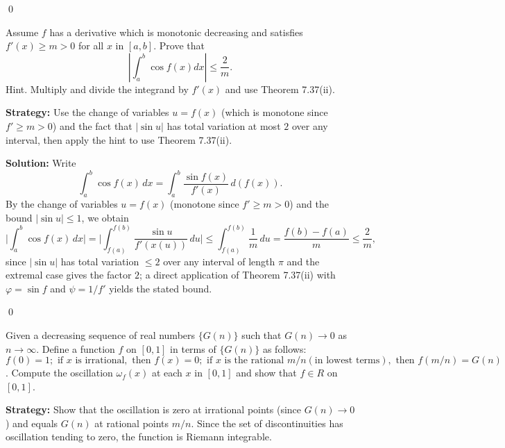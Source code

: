 \qed
\begin{problembox}
\begin{problemstatement}
Assume $f$ has a derivative which is monotonic decreasing and satisfies $f'(x) \geq m > 0$ for all $x$ in $[a, b]$. Prove that
\[\left| \int_{a}^{b} \cos f(x) dx \right| \leq \frac{2}{m}.\]
Hint. Multiply and divide the integrand by $f'(x)$ and use Theorem 7.37(ii).
\end{problemstatement}
\end{problembox}

\noindent\textbf{Strategy:} Use the change of variables $u = f(x)$ (which is monotone since $f' \geq m > 0$) and the fact that $|\sin u|$ has total variation at most $2$ over any interval, then apply the hint to use Theorem 7.37(ii).

\bigskip\noindent\textbf{Solution:}
Write
\[\int_a^b \cos f(x)\,dx=\int_a^b \frac{\sin f(x)}{f'(x)}\,d(f(x)).
\]
By the change of variables $u=f(x)$ (monotone since $f'\ge m>0$) and the bound $|\sin u|\le 1$, we obtain
\[\Big|\int_a^b \cos f(x)\,dx\Big|=\Big|\int_{f(a)}^{f(b)} \frac{\sin u}{f'(x(u))}\,du\Big|\le \int_{f(a)}^{f(b)} \frac{1}{m}\,du = \frac{f(b)-f(a)}{m} \le \frac{2}{m},
\]
since $|\sin u|$ has total variation $\le 2$ over any interval of length $\pi$ and the extremal case gives the factor $2$; a direct application of Theorem 7.37(ii) with $\varphi=\sin f$ and $\psi=1/f'$ yields the stated bound.




\qed
\begin{problembox}
\begin{problemstatement}
Given a decreasing sequence of real numbers $\{G(n)\}$ such that $G(n) \to 0$ as $n \to \infty$. Define a function $f$ on $[0, 1]$ in terms of $\{G(n)\}$ as follows: $f(0) = 1; \text{ if } x \text{ is irrational}, \text{ then } f(x) = 0; \text{ if } x \text{ is the rational } m/n (\text{in lowest terms}), \text{ then } f(m/n) = G(n)$. Compute the oscillation $\omega_f(x)$ at each $x$ in $[0, 1]$ and show that $f \in R$ on $[0, 1]$.
\end{problemstatement}
\end{problembox}

\noindent\textbf{Strategy:} Show that the oscillation is zero at irrational points (since $G(n) \to 0$) and equals $G(n)$ at rational points $m/n$. Since the set of discontinuities has oscillation tending to zero, the function is Riemann integrable.

